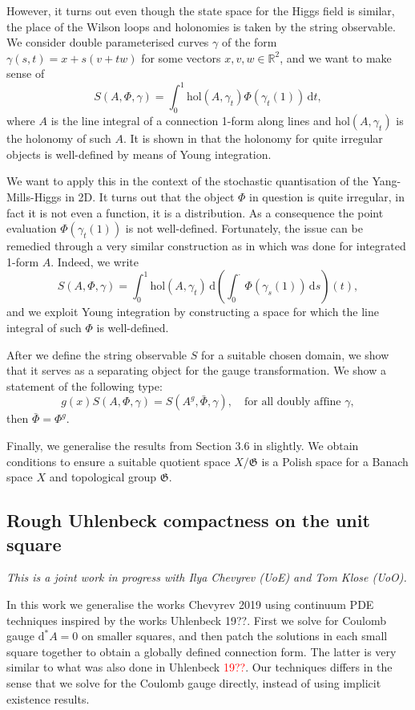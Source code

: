 \documentclass[12pt]{article}
\numberwithin{equation}{section}
\theoremstyle{definition}
\theoremstyle{remark}
\newcommand{\hol}{\mathrm{hol}}
\newcommand{\diff}{\mathrm{d}}
\newcommand{\R}{\mathbb R}
\newcommand{\1}{\mathbf 1}
\newcommand{\<}{\langle}
\renewcommand{\>}{\rangle}
\newcommand{\red}[1]{\textcolor{red}{#1}}
\begin{document}
However, it turns out even though the state space for the Higgs field is similar, the place of the Wilson loops and holonomies is taken by the string observable. We consider double parameterised curves $\gamma$ of the form $\gamma(s,t)=x+s(v+tw)$ for some vectors $x,v,w\in \R^2$, and we want to make sense of
$$S(A,\Phi,\gamma)=\int^1_0 \hol(A,\gamma_t)\Phi(\gamma_t(1))\,\diff t,$$
where $A$ is the line integral of a connection 1-form along lines and $\hol(A,\gamma_t)$ is the holonomy of such $A$. It is shown in \cite{CCHS_2D_YM} that the holonomy for quite irregular objects is well-defined by means of Young integration. 

We want to apply this in the context of the stochastic quantisation of the Yang-Mills-Higgs in 2D. It turns out that the object $\Phi$ in question is quite irregular, in fact it is not even a function, it is a distribution. As a consequence the point evaluation $\Phi(\gamma_t(1))$ is not well-defined. Fortunately, the issue can be remedied through a very similar construction as in \cite{CCHS_2D_YM} which was done for integrated 1-form $A$.  Indeed, we write
$$S(A,\Phi,\gamma)=\int^1_0 \hol(A,\gamma_t)\,\diff\left( \int^\cdot_0 \Phi(\gamma_s(1))\,\diff s\right)(t),$$
and we exploit Young integration by constructing a space for which the line integral of such $\Phi$ is well-defined. 

After we define the string observable $S$ for a suitable chosen domain, we show that it serves as a separating object for the gauge transformation. We show a statement of the following type:
$$g(x)S(A,\Phi,\gamma)=S(A^g,\bar\Phi,\gamma), \  \ \ \text{ for all doubly affine }\gamma,$$
then $\bar\Phi=\Phi^g$. 

Finally, we generalise the results from Section 3.6 in \cite{CCHS_2D_YM} slightly. We obtain conditions to ensure a suitable quotient space $X/\mathfrak G$ is a Polish space for a Banach space $X$ and topological group $\mathfrak G$. 


\subsection{Rough Uhlenbeck compactness on the unit square}
\textit{This is a joint work in progress with Ilya Chevyrev (UoE) and Tom Klose (UoO).}

\medskip

\noindent In this work we generalise the works Chevyrev 2019 using continuum PDE techniques inspired by the works Uhlenbeck 19??. First we solve for Coulomb gauge $\diff^*A=0$ on smaller squares, and then patch the solutions in each small square together to obtain a globally defined connection form. The latter is very similar to what was also done in Uhlenbeck \red{19??}. Our techniques differs in the sense that we solve for the Coulomb gauge directly, instead of using implicit existence results. 
\end{document}
